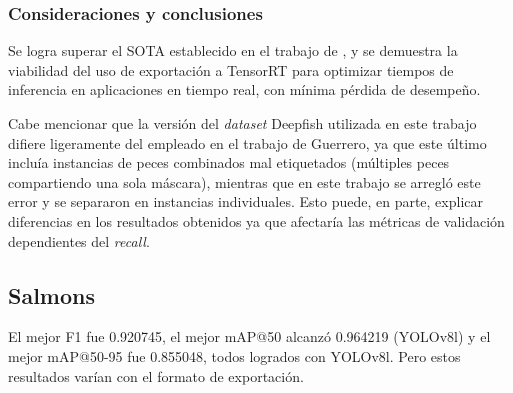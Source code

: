 \subsubsection{Consideraciones y conclusiones}
Se logra superar el SOTA establecido en el trabajo de \cite[Alejandro Guerrero, 2024]{Guerrero2024}, y se demuestra la viabilidad del uso de exportación a TensorRT para optimizar tiempos de inferencia en aplicaciones en tiempo real, con mínima pérdida de desempeño.

Cabe mencionar que la versión del \textit{dataset} Deepfish utilizada en este trabajo difiere ligeramente del empleado en el trabajo de Guerrero, ya que este último incluía instancias de peces combinados mal etiquetados (múltiples peces compartiendo una sola máscara), mientras que en este trabajo se arregló este error y se separaron en instancias individuales. Esto puede, en parte, explicar diferencias en los resultados obtenidos ya que afectaría las métricas de validación dependientes del \textit{recall}.


\subsection{Salmons}
El mejor F1 fue 0.920745, el mejor mAP@50 alcanzó 0.964219 (YOLOv8l) y el mejor mAP@50-95 fue 0.855048, todos logrados con YOLOv8l. Pero estos resultados varían con el formato de exportación.

